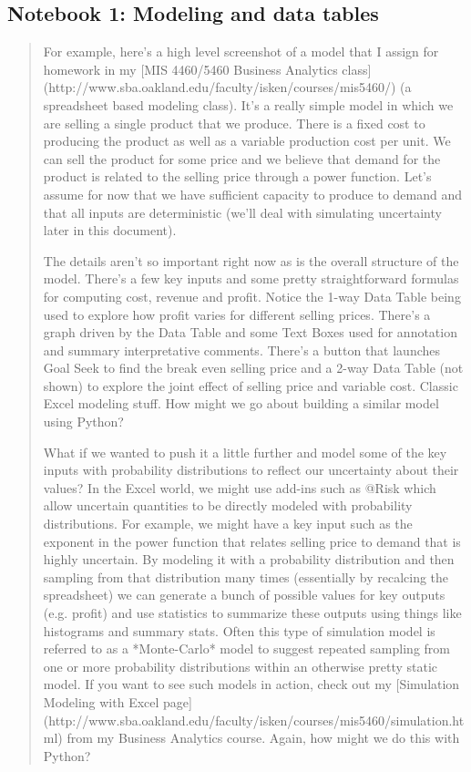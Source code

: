 \documentclass[ited,blindrev]{informs3}              %
\begin{document}
 
\subsection{Notebook 1: Modeling and data tables}

\begin{quote}
	For example, here's a high level screenshot of a model that I assign for homework in my [MIS 4460/5460 Business Analytics class](http://www.sba.oakland.edu/faculty/isken/courses/mis5460/) (a spreadsheet based modeling class).
	It's a really simple model in which we are selling a single product that we produce. There is a fixed cost to producing the product as well as a variable production cost per unit. We can sell the product for some price and we believe that demand for the product is related to the selling price through a power function. Let's assume for now that we have sufficient capacity to produce to demand and that all inputs are deterministic (we'll deal with simulating uncertainty later in this document).
	
	The details aren't so important right now as is the overall structure of the model. There's a few key inputs and some pretty straightforward formulas for computing cost, revenue and profit. Notice the 1-way Data Table being used to explore how profit varies for different selling prices. There's a graph driven by the Data Table and some Text Boxes used for annotation and summary interpretative comments. There's a button that launches Goal Seek to find the break even selling price and a 2-way Data Table (not shown) to explore the joint effect of selling price and variable cost. Classic Excel modeling stuff. How might we go about building a similar model using Python?  
	
	What if we wanted to push it a little further and model some of the key inputs with probability distributions to reflect our uncertainty about their values? In the Excel world, we might use add-ins such as @Risk which allow uncertain quantities to be directly modeled with probability distributions. For example, we might have a key input such as the exponent in the power function that relates selling price to demand that is highly uncertain. By modeling it with a probability distribution and then sampling from that distribution many times (essentially by recalcing the spreadsheet) we can generate a bunch of possible values for key outputs (e.g. profit) and use statistics to summarize these outputs using things like histograms and summary stats. Often this type of simulation model is referred to as a *Monte-Carlo* model to suggest repeated sampling from one or more probability distributions within an otherwise pretty static model. If you want to see such models in action, check out my [Simulation Modeling with Excel page](http://www.sba.oakland.edu/faculty/isken/courses/mis5460/simulation.html) from my Business Analytics course. Again, how might we do this with Python?
\end{quote}
\end{document}
